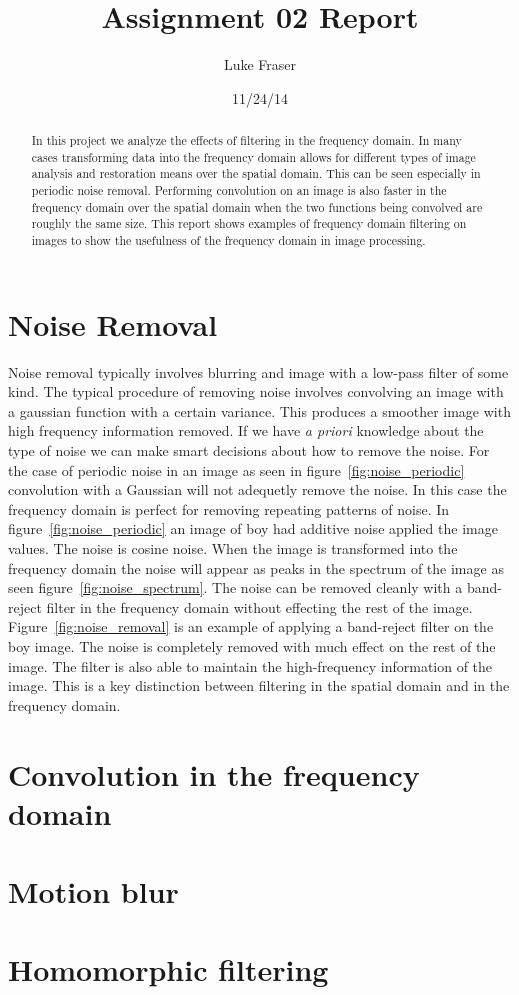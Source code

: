 \documentclass[letterpaper]{article}
\title{Assignment 02 Report}
\author{Luke Fraser}
\date{11/24/14}
\begin{document}
\maketitle
\begin{abstract}
In this project we analyze the effects of filtering in the frequency domain. In many cases transforming data into the frequency domain allows for different types of image analysis and restoration means over the spatial domain. This can be seen especially in periodic noise removal. Performing convolution on an image is also faster in the frequency domain over the spatial domain when the two functions being convolved are roughly the same size. This report shows examples of frequency domain filtering on images to show the usefulness of the frequency domain in image processing.
\end{abstract}

\section{Noise Removal}
Noise removal typically involves blurring and image with a low-pass filter of some kind. The typical procedure of removing noise involves convolving an image with a gaussian function with a certain variance. This produces a smoother image with high frequency information removed. If we have \emph{a priori} knowledge about the type of noise we can make smart decisions about how to remove the noise. For the case of periodic noise in an image as seen in figure~\ref{fig:noise_periodic} convolution with a Gaussian will not adequetly remove the noise. In this case the frequency domain is perfect for removing repeating patterns of noise. In figure~\ref{fig:noise_periodic} an image of boy had additive noise applied the image values. The noise is cosine noise. When the image is transformed into the frequency domain the noise will appear as peaks in the spectrum of the image as seen figure~\ref{fig:noise_spectrum}. The noise can be removed cleanly with a band-reject filter in the frequency domain without effecting the rest of the image. Figure~\ref{fig:noise_removal} is an example of applying a band-reject filter on the boy image. The noise is completely removed with much effect on the rest of the image. The filter is also able to maintain the high-frequency information of the image. This is a key distinction between filtering in the spatial domain and in the frequency domain.
\section{Convolution in the frequency domain}
\section{Motion blur}
\section{Homomorphic filtering}
  
\end{document}
